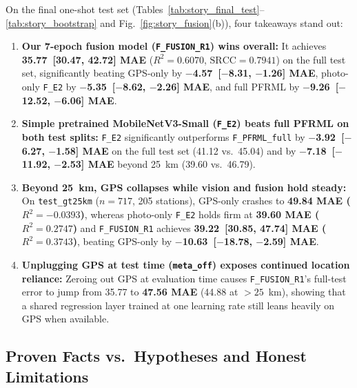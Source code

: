 \documentclass[conference]{IEEEtran}
\begin{document}
On the final one-shot test set
(Tables~\ref{tab:story_final_test}--\ref{tab:story_bootstrap} and
Fig.~\ref{fig:story_fusion}(b)), four takeaways stand out:
\begin{enumerate}
  \item \textbf{Our 7-epoch fusion model (\texttt{F\_FUSION\_R1}) wins overall:}
        It achieves \textbf{35.77~[30.47, 42.72] MAE} ($R^2 = 0.6070$,
        $\text{SRCC} = 0.7941$) on the full test set, significantly beating
        GPS-only by \textbf{$-$4.57~[$-$8.31, $-$1.26] MAE}, photo-only
        \texttt{F\_E2} by \textbf{$-$5.35~[$-$8.62, $-$2.26] MAE}, and full
        PFRML by \textbf{$-$9.26~[$-$12.52, $-$6.06] MAE}.
  \item \textbf{Simple pretrained MobileNetV3-Small (\texttt{F\_E2}) beats full
        PFRML on both test splits:} \texttt{F\_E2} significantly outperforms
        \texttt{F\_PFRML\_full} by \textbf{$-$3.92~[$-$6.27, $-$1.58] MAE} on
        the full test set (41.12 vs.\ 45.04) and by \textbf{$-$7.18~[$-$11.92,
        $-$2.53] MAE} beyond 25~km (39.60 vs.\ 46.79).
  \item \textbf{Beyond 25~km, GPS collapses while vision and fusion hold
        steady:} On \texttt{test\_gt25km} ($n = 717$, 205 stations), GPS-only
        crashes to \textbf{49.84 MAE ($R^2 = -0.0393$)}, whereas photo-only
        \texttt{F\_E2} holds firm at \textbf{39.60 MAE ($R^2 = 0.2747$)} and
        \texttt{F\_FUSION\_R1} achieves \textbf{39.22~[30.85, 47.74] MAE
        ($R^2 = 0.3743$)}, beating GPS-only by \textbf{$-$10.63~[$-$18.78,
        $-$2.59] MAE}.
  \item \textbf{Unplugging GPS at test time (\texttt{meta\_off}) exposes
        continued location reliance:} Zeroing out GPS at evaluation time causes
        \texttt{F\_FUSION\_R1}'s full-test error to jump from 35.77 to
        \textbf{47.56 MAE} (44.88 at $> 25$~km), showing that a shared
        regression layer trained at one learning rate still leans heavily on GPS
        when available.
\end{enumerate}

\subsection{Proven Facts vs.\ Hypotheses and Honest Limitations}
\label{subsec:discussion_limitations}
\end{document}
